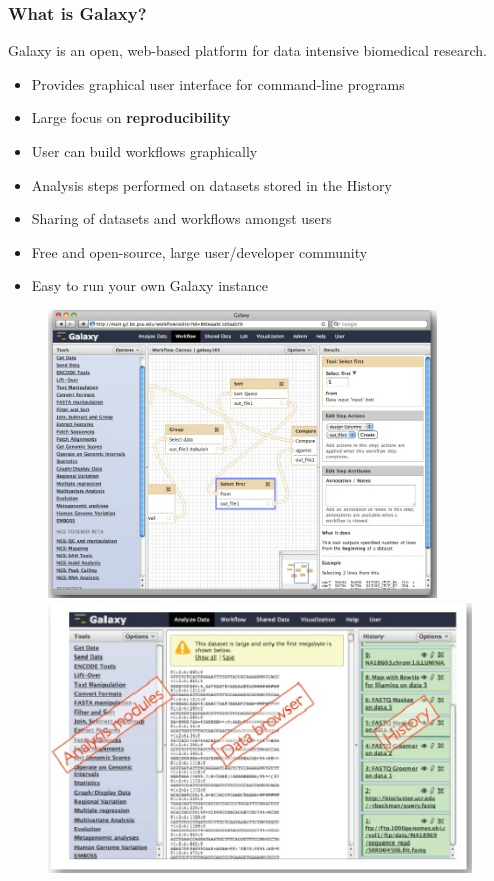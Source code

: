 \documentclass{beamer}              %
\begin{document}
\begin{frame}
    \frametitle{What is Galaxy?}
	Galaxy is an open, web-based platform for data intensive biomedical research.
	\begin{itemize}
		\item Provides graphical user interface for command-line programs
		\item Large focus on \textbf{reproducibility}
		\item User can build workflows graphically
		\item Analysis steps performed on datasets stored in the History
		\item Sharing of datasets and workflows amongst users
		\item Free and open-source, large user/developer community
		\item Easy to run your own Galaxy instance
	\end{itemize}
	\begin{figure}
		\includegraphics[height=0.25\textheight]{figures/101p_01a.png} \qquad\qquad
		\includegraphics[height=0.25\textheight]{figures/101p_01b.png}
	\end{figure}
\end{frame}
\end{document}
